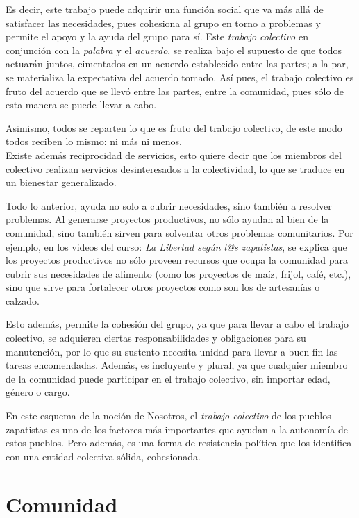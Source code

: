 \documentclass[oneside]{book}
\begin{document}
Es decir, este trabajo puede adquirir una función social que va más allá de satisfacer las necesidades, pues cohesiona al grupo en torno a problemas y permite el apoyo y la ayuda del grupo para sí. Este \textit{trabajo colectivo} en conjunción con la \textit{palabra} y el \textit{acuerdo}, se realiza bajo el supuesto de que todos actuarán juntos, cimentados en un acuerdo establecido entre las partes; a la par, se materializa la expectativa del acuerdo tomado. Así pues, el trabajo colectivo es fruto del acuerdo que se llevó entre las partes, entre la comunidad, pues sólo de esta manera se puede llevar a cabo.
	
Asimismo, todos se reparten lo que es fruto del trabajo colectivo, de este modo todos reciben lo mismo: ni más ni menos. 
\\

Existe además reciprocidad de servicios, esto quiere decir que los miembros del colectivo realizan servicios desinteresados a la colectividad, lo que se traduce en un bienestar generalizado.

Todo lo anterior, ayuda no solo a cubrir necesidades, sino también a resolver problemas. Al generarse proyectos productivos, no sólo ayudan al bien de la comunidad, sino también sirven para solventar otros problemas comunitarios. Por ejemplo, en los videos del curso: \textit{La Libertad según l@s zapatistas}, se explica que los proyectos productivos no sólo proveen recursos que ocupa la comunidad para cubrir sus necesidades de alimento (como los proyectos de maíz, frijol, café, etc.), sino que sirve para fortalecer otros proyectos como son los de artesanías o calzado.

Esto además, permite la cohesión del grupo, ya que para llevar a cabo el trabajo colectivo, se adquieren ciertas responsabilidades y obligaciones para su manutención, por lo que su sustento necesita unidad para llevar a buen fin las tareas encomendadas. Además, es incluyente y plural, ya que cualquier miembro de la comunidad puede participar en el trabajo colectivo, sin importar edad, género o cargo.

En este esquema de la noción de Nosotros, el \textit{trabajo colectivo} de los pueblos zapatistas es uno de los factores más importantes que ayudan a la autonomía de estos pueblos. Pero además, es una forma de resistencia política que los identifica con una entidad colectiva sólida, cohesionada.

\section{Comunidad}
\end{document}
